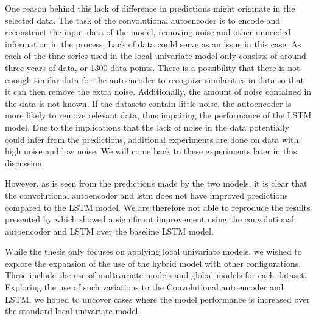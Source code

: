 One reason behind this lack of difference in predictions might originate in the selected data.
The task of the convolutional autoencoder is to encode and reconstruct the input data of the model,
removing noise and other unneeded information in the process.
Lack of data could serve as an issue in this case.
As each of the time series used in the local univariate model only consists of around three years of data, or 1300 data points.
There is a possibility that there is not enough similar data for the autoencoder to recognize similarities in data
so that it can then remove the extra noise.
Additionally, the amount of noise contained in the data is not known.
If the datasets contain little noise, the autoencoder is more likely to remove relevant data, thus impairing the performance of the LSTM model.
Due to the implications that the lack of noise in the data potentially could infer from the predictions,
additional experiments are done on data with high noise and low noise.
We will come back to these experiments later in this discussion.

However, as is seen from the predictions made by the two models, it is clear that the convolutional autoencoder and lstm
does not have improved predictions compared to the LSTM model.
We are therefore not able to reproduce the results presented by \cite{Zhao2019}
which showed a significant improvement using the convolutional autoencoder and LSTM over the baseline LSTM model.


While the thesis \cite{Zhao2019} only focuses on applying local univariate models,
we wished to explore the expansion of the use of the hybrid model with other configurations.
These include the use of multivariate models and global models for each dataset.
Exploring the use of such variations to the Convolutional autoencoder and LSTM,
we hoped to uncover cases where the model performance is increased over the standard local univariate model.







